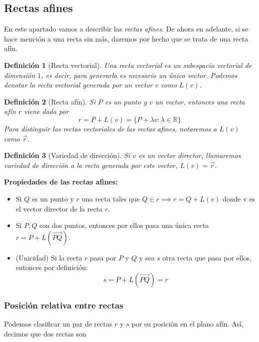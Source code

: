 \documentclass[11pt, a4paper]{article}
\makeatletter
\newif\IfInSansMode
\let\oldsf\sffamily
\renewcommand*{\sffamily}{\oldsf\mathversion{sans}\InSansModetrue}
\let\oldnorm\normalfont
\renewcommand*{\normalfont}{\oldnorm\InSansModefalse\mathversion{normal}}
\renewenvironment{proof}[1][\proofname] {\vspace{-15pt}\par\pushQED{\qed}\normalfont\topsep6\p@\@plus6\p@\relax\trivlist\item[\hskip\labelsep\it#1\@addpunct{.}]\ignorespaces}{\popQED\endtrivlist\@endpefalse}
\newcommand{\R}{\mathbb{R}}
\renewcommand{\vec}{\overrightarrow}
\renewenvironment{proof}[1][\proofname] {\par\pushQED{\qed}\normalfont\topsep6\p@\@plus6\p@\relax\trivlist\item[\hskip\labelsep\itshape\sffamily#1\@addpunct{.}]\ignorespaces}{\popQED\endtrivlist\@endpefalse}
\theoremstyle{theorem-style}
\theoremstyle{definition-style}
\newtheorem{ndef}{Definición}[section]
\theoremstyle{remark-style}
\theoremstyle{example-style}
\makeatother
\begin{document}
\subsection{Rectas afines}

En este apartado vamos a describir las \textit{rectas afines}. De ahora en adelante, si se hace mención a una recta sin más, daremos por hecho que se trata de una recta afín.

\begin{ndef}[Recta vectorial]
  Una recta vectorial es un subespacio vectorial de dimensión $1$, es decir, para generarla es necesario un único vector. Podemos denotar la recta vectorial generada por un vector $v$ como $L(v)$.
\end{ndef}

\begin{ndef}[Recta afín]
  Si $P$ es un punto y $v$ un vector, entonces una recta afín $r$ viene dada por
  \[
    r = P+L(v) = \{P + \lambda v : \lambda \in \R\}
  \]
  Para distinguir las rectas vectoriales de las rectas afines, notaremos a $L(v)$ como $\vec{r}$.
\end{ndef}

\begin{ndef}[Variedad de dirección]
  Si $v$ es un \textit{vector director}, llamaremos \textit{variedad de dirección} a la recta generada por este vector, $L(v) = \vec{r}$.
\end{ndef}

\textbf{Propiedades de las rectas afines:}
\begin{itemize}
\item Si $Q$ es un punto y $r$ una recta tales que $Q\in r \implies r = Q +L(v)$ donde v es el vector director de la recta $r$.
\item Si $P,Q$ son dos puntos, entonces por ellos pasa una única recta $r = P +L(\overrightarrow{PQ})$. \\
  \begin{proof}
    (Unicidad) Si la recta $r$ pasa por $P$ y $Q$ y sea $s$ otra recta que pasa por ellos, entonces por definición:
    \[
      s = P+L(\overrightarrow{PQ}) = r
    \]
  \end{proof}
\end{itemize}

\subsubsection{Posición relativa entre rectas}

Podemos clasificar un par de rectas $r$ y $s$ por su posición en el plano afín. Así, decimos que dos rectas son
\end{document}
